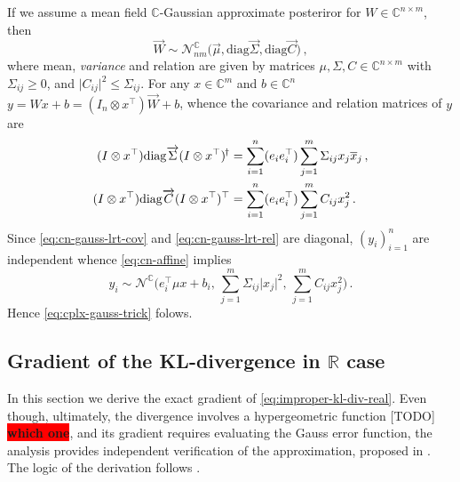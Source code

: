 \documentclass[a4paper,10pt]{article}
\newcommand{\real}{\mathbb{R}}
\newcommand{\cplx}{\mathbb{C}}
\newcommand{\hop}{{\mkern-1.5mu\dagger}}
\newcommand{\conj}[1]{\overline{#1}}
\renewcommand{\vec}[1]{\overrightarrow{#1}}
\newcommand{\diag}[1]{\mathrm{diag}{#1}}
\newcommand{\important}[1]{\textbf{\!\colorbox{red}{#1}\!}}
\newcommand{\todo}[1]{{\color{blue} [TODO]} \important{#1}}
\begin{document}
If we assume a mean field $\cplx$-Gaussian approximate posteriror for $
  W \in \cplx^{n\times m}
$, then
\begin{equation}  \label{eq:c-gauss-vi-general-vec}
  \vec{W}
    \sim \mathcal{N}^{\cplx}_{nm} \bigl(
      \vec{\mu}, \diag{\vec{\Sigma}}, \diag{\vec{C}}
    \bigr)
  \,,
\end{equation}
where mean, \textit{variance} and relation are given by matrices $
  \mu, \Sigma, C \in \cplx^{n\times m}
$ with $\Sigma_{ij} \geq 0$, and $
  \lvert C_{ij} \rvert^2 \leq \Sigma_{ij}
$. For any $x \in \cplx^m$ and $b\in \cplx^n$ $
  y = W x + b
    = (I_n \otimes x^\top) \vec{W} + b
$, whence the covariance and relation matrices of $y$ are
\begin{align}
  (I \otimes x^\top) \diag{\vec{\Sigma}} (I \otimes x^\top)^{\hop}
    & = \sum_{i=1}^n (e_i e_i^\top) \sum_{j=1}^m \Sigma_{ij} x_j \conj{x}_j
    \,,  \label{eq:cn-gauss-lrt-cov} \\
  (I \otimes x^\top) \diag{\vec{C}} (I \otimes x^\top)^\top
    & = \sum_{i=1}^n (e_i e_i^\top) \sum_{j=1}^m C_{ij} x_j^2
    \,.  \label{eq:cn-gauss-lrt-rel}
\end{align}
Since \eqref{eq:cn-gauss-lrt-cov} and \eqref{eq:cn-gauss-lrt-rel} are diagonal, $(y_i)_{i=1}^n$
are independent whence \eqref{eq:cn-affine} implies
\begin{equation}  \label{eq:cplx-gauss-trick-appendix}
  y_i
    \sim \mathcal{N}^{\cplx}
      \bigl(
        e_i^\top \mu x + b_i,
        \, \sum_{j=1}^m \Sigma_{ij} \lvert x_j \rvert^2,
        \, \sum_{j=1}^m C_{ij} x_j^2
      \bigr)
    \,.
\end{equation}
Hence \eqref{eq:cplx-gauss-trick} folows.


\subsection{Gradient of the KL-divergence in $\real$ case} %
\label{sub:real-chisq-grad}  %

In this section we derive the exact gradient of \eqref{eq:improper-kl-div-real}. Even
though, ultimately, the divergence involves a hypergeometric function \todo{which one},
and its gradient requires evaluating the Gauss error function, the analysis provides
independent verification of the approximation, proposed in \citep{molchanov_variational_2017}.
The logic of the derivation follows \citep{lapidoth_capacity_2003}.
\end{document}
